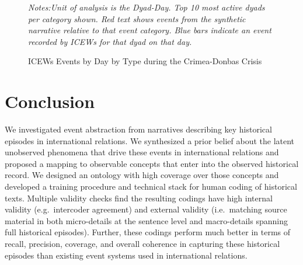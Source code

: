 \documentclass{article}
\begin{document}
\begin{figure}[H]
\caption{ICEWs Events by Day by Type during the Crimea-Donbas Crisis \label{fig:p_precision_icews}}
\textit{Notes:Unit of analysis is the Dyad-Day. Top 10 most active dyads per category shown. Red text shows events from the synthetic narrative relative to that event category. Blue bars indicate an event recorded by ICEWs for that dyad on that day. }
\end{figure}
\clearpage

\hypertarget{conclusion}{%
\section{Conclusion}\label{conclusion}}

We investigated event abstraction from narratives describing key
historical episodes in international relations. We synthesized a prior
belief about the latent unobserved phenomena that drive these events in
international relations and proposed a mapping to observable concepts
that enter into the observed historical record. We designed an ontology
with high coverage over those concepts and developed a training
procedure and technical stack for human coding of historical texts.
Multiple validity checks find the resulting codings have high internal
validity (e.g.~intercoder agreement) and external validity
(i.e.~matching source material in both micro-details at the sentence
level and macro-details spanning full historical episodes). Further,
these codings perform much better in terms of recall, precision,
coverage, and overall coherence in capturing these historical episodes
than existing event systems used in international relations.
\end{document}
